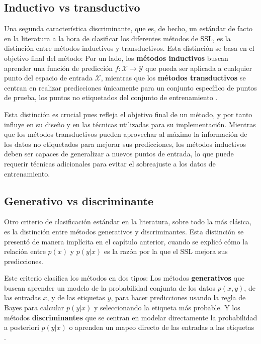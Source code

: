 \subsection{Inductivo vs transductivo}
\label{sec:div-inductivo-transductivo}

Una segunda característica discriminante, que es, de hecho, un estándar de facto en la literatura a la hora de clasificar los diferentes métodos de \gls{SSL}, es la distinción entre métodos inductivos y transductivos. Esta distinción se basa en el objetivo final del método: Por un lado, los \textbf{métodos inductivos} buscan aprender una función de predicción $f : \mathcal{X} \to \mathcal{Y}$ que pueda ser aplicada a cualquier punto del espacio de entrada $\mathcal{X}$, mientras que los \textbf{métodos transductivos} se centran en realizar predicciones únicamente para un conjunto específico de puntos de prueba, los puntos no etiquetados del conjunto de entrenamiento \cite{10.7551/mitpress/9780262033589.001.0001}.

Esta distinción es crucial pues refleja el objetivo final de un método, y por tanto influye en su diseño y en las técnicas utilizadas para su implementación. Mientras que los métodos transductivos pueden aprovechar al máximo la información de los datos no etiquetados para mejorar sus predicciones, los métodos inductivos deben ser capaces de generalizar a nuevos puntos de entrada, lo que puede requerir técnicas adicionales para evitar el sobreajuste a los datos de entrenamiento.

\subsection{Generativo vs discriminante}
\label{sec:div-generativo-discriminante}

Otro criterio de clasificación estándar en la literatura, sobre todo la más clásica, es la distinción entre métodos generativos y discriminantes. Esta distinción se presentó de manera implícita en el capítulo anterior, cuando se explicó cómo la relación entre $p(x)$ y $p(y|x)$ es la razón por la que el \gls{SSL} mejora sus predicciones.

Este criterio clasifica los métodos en dos tipos: Los métodos \textbf{generativos} que buscan aprender un modelo de la probabilidad conjunta de los datos $p(x,y)$, de las entradas $x$, y de las etiquetas $y$, para hacer predicciones usando la regla de Bayes para calcular $p(y|x)$ y seleccionando la etiqueta más probable. Y los métodos \textbf{discriminantes} que se centran en modelar directamente la probabilidad a posteriori $p(y|x)$ o aprenden un mapeo directo de las entradas a las etiquetas \cite{ng2001discriminative}.

